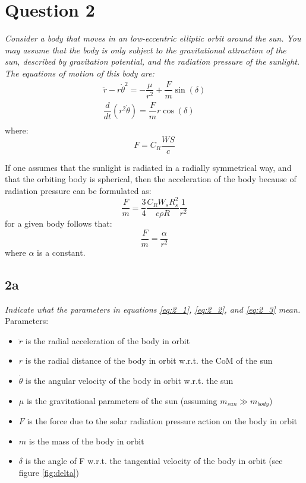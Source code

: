 \section{ Question 2  }\label{sec:q2} 

\textit{Consider a body that moves in an low-eccentric elliptic orbit around the sun. You may assume that the body is only subject to the gravitational attraction of the sun, described by gravitation potential, and the radiation pressure of the sunlight. The equations of motion of this body are:}
\begin{equation}\label{eq:2_1}
\begin{split}
    \ddot{r}-r\dot{\theta} ^{2}=-\dfrac {\mu }{r^{2}}+\dfrac {F}{m}\sin \left( \delta \right) \\
    \dfrac {d}{dt}\left( r^{2}\dot{\theta} \right) =\dfrac {F}{m}r\cos \left( \delta \right) \\
\end{split}
\end{equation}
where:
\begin{equation} \label{eq:2_2}
    F = C_R \frac{W S}{c}
\end{equation}

If one assumes that the sunlight is radiated in a radially symmetrical way, and that the orbiting body is spherical, then the acceleration of the body because of radiation pressure can be formulated as:
\begin{equation}\label{eq:2_3}
    \dfrac {F}{m}=\dfrac {3}{4}\dfrac {C_{R}W_{s}R^{2}_{s}}{c \rho R}\dfrac {1}{r^{2}}
\end{equation}
for a given body follows that:
\begin{equation}
    \frac{F}{m} = \frac{\alpha}{r^2}
\end{equation}
where $\alpha$ is a constant. 

\subsection{2a}
\textit{Indicate what the parameters in equations \ref{eq:2_1}, \ref{eq:2_2}, and \ref{eq:2_3} mean.}\\
Parameters:
\begin{itemize}
    \item $\ddot{r}$ is the radial acceleration of the body in orbit
    \item $r$ is the radial distance of the body in orbit w.r.t. the CoM of the sun
    \item $\dot{\theta}$ is the angular velocity of the body in orbit w.r.t. the sun
    \item $\mu$ is the gravitational parameters of the sun (assuming $m_{sun} \gg m_{body}$)
    \item $F$ is the force due to the solar radiation pressure action on the body in orbit
    \item $m$ is the mass of the body in orbit
    \item $\delta$ is the angle of F w.r.t. the tangential velocity of the body in orbit (see figure \ref{fig:delta})
\end{itemize}


